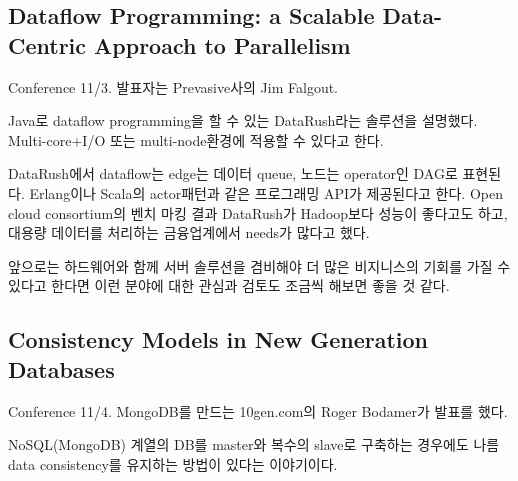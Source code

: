 \documentclass[11pt]{article}
\begin{document}
% 



\subsection{Dataflow Programming: a Scalable
  Data-Centric Approach to Parallelism}

Conference 11/3. 발표자는 Prevasive사의 Jim Falgout.
 
Java로 dataflow programming을 할 수 있는 DataRush라는 솔루션을 설명했다.
Multi-core+I/O 또는 multi-node환경에 적용할 수 있다고 한다.
 
DataRush에서 dataflow는 edge는 데이터 queue, 노드는 operator인 DAG로 표현된다.
Erlang이나 Scala의 actor패턴과 같은 프로그래밍 API가 제공된다고 한다.
Open cloud consortium의 벤치 마킹 결과 DataRush가 Hadoop보다 성능이 좋다고도
하고, 대용량 데이터를 처리하는 금융업계에서 needs가 많다고 했다.
 
 
앞으로는 하드웨어와 함께 서버 솔루션을 겸비해야 더 많은 비지니스의 기회를 
가질 수 있다고 한다면 이런 분야에 대한 관심과 검토도 조금씩 해보면 좋을 것 
같다.

\subsection{Consistency Models in New Generation Databases}
Conference 11/4. MongoDB를 만드는 10gen.com의 Roger Bodamer가 발표를 했다.
 
NoSQL(MongoDB) 계열의 DB를 master와 복수의 slave로 구축하는 경우에도
나름 data consistency를 유지하는 방법이 있다는 이야기이다.
 
\end{document}
